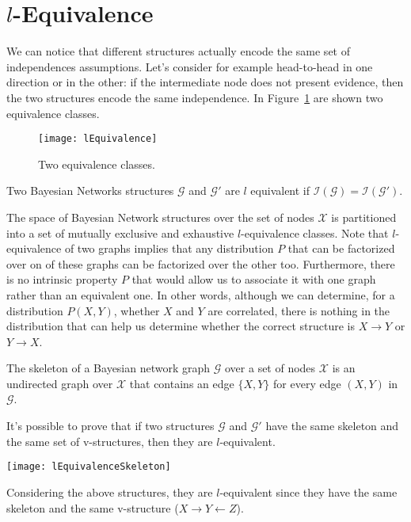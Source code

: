\section{$l$-Equivalence}
We can notice that different structures actually encode the same set of independences assumptions. Let's consider for example head-to-head in one direction or in the other: if the intermediate node does not present evidence, then the two structures encode the same independence. In Figure~\ref{fig:lEquivalence} are shown two equivalence classes. 
\begin{figure}[htp]
  \centering
  \texttt{[image: lEquivalence]}
  \caption{Two equivalence classes.}
  \label{fig:lEquivalence}
\end{figure}
\begin{definition}[$l$-Equivalence]
  Two Bayesian Networks structures $\mathcal{G}$ and $\mathcal{G}'$ are $l$ equivalent if $\mathcal{I}(\mathcal{G})=\mathcal{I}(\mathcal{G}')$.
\end{definition}
The space of Bayesian Network structures over the set of nodes $\mathcal{X}$ is partitioned into a set of mutually exclusive and exhaustive $l$-equivalence classes. \newline
Note that $l$-equivalence of two graphs implies that any distribution $P$ that can be factorized over on of these graphs can be factorized over the other too. Furthermore, there is no intrinsic property $P$ that would allow us to associate it with one graph rather than an equivalent one. In other words, although we can determine, for a distribution $P(X,Y)$, whether $X$ and $Y$ are correlated, there is nothing in the distribution that can help us determine whether the correct structure is $X\rightarrow Y$ or $Y\rightarrow X$. \newline
\begin{definition}[Skeleton]
  The skeleton of a Bayesian network graph $\mathcal{G}$ over a set of nodes $\mathcal{X}$ is an undirected graph over $\mathcal{X}$ that contains an edge $\{X,Y\}$ for every edge $(X,Y)$ in $\mathcal{G}$.
\end{definition}
It's possible to prove that if two structures $\mathcal{G}$ and $\mathcal{G}'$ have the same skeleton and the same set of v-structures, then they are $l$-equivalent. 
\begin{center}
  \texttt{[image: lEquivalenceSkeleton]}
\end{center}
Considering the above structures, they are $l$-equivalent since they have the same skeleton and the same v-structure ($X\rightarrow Y\leftarrow Z$). \newline
